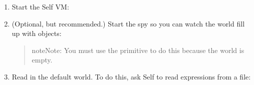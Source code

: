 \documentclass[letterpaper,10pt,english]{sphinxmanual}
\begin{document}
\begin{enumerate}
\item {} 
Start the Self VM:

\begin{sphinxVerbatim}[commandchars=\\\{\}]
 
              
        

\end{sphinxVerbatim}

\item {} 
(Optional, but recommended.) Start the spy so you can watch the world fill up with objects:
\begin{quote}

\begin{sphinxVerbatim}[commandchars=\\\{\}]
\end{sphinxVerbatim}

\begin{sphinxadmonition}{note}{Note:}
You must use the primitive to do this because the world is empty.
\end{sphinxadmonition}
\end{quote}

\item {} 
Read in the default world. To do this, ask Self to read expressions from a file:
\begin{quote}

\begin{sphinxVerbatim}[commandchars=\\\{\}]
\end{sphinxVerbatim}
\end{quote}

\end{enumerate}
\end{document}
